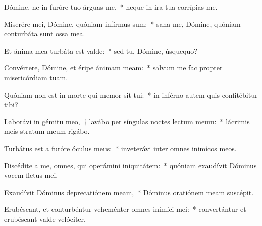 \item Dómine, ne in furóre tuo árguas me,~* neque in ira tua corrípias me.

\item Miserére mei, Dómine, quóniam infírmus sum:~* sana me, Dómine, quóniam conturbáta sunt ossa mea.

\item Et ánima mea turbáta est valde:~* sed tu, Dómine, úsquequo?

\item Convértere, Dómine, et éripe ánimam meam:~* salvum me fac propter misericórdiam tuam.

\item Quóniam non est in morte qui memor sit tui:~* in inférno autem quis confitébitur tibi?

\item Laborávi in gémitu meo,~† lavábo per síngulas noctes lectum meum:~* lácrimis meis stratum meum rigábo.

\item Turbátus est a furóre óculus meus:~* inveterávi inter omnes inimícos meos.

\item Discédite a me, omnes, qui operámini iniquitátem:~* quóniam exaudívit Dóminus vocem fletus mei.

\item Exaudívit Dóminus deprecatiónem meam,~* Dóminus oratiónem meam suscépit.

\item Erubéscant, et conturbéntur veheménter omnes inimíci mei:~* convertántur et erubéscant valde velóciter.
